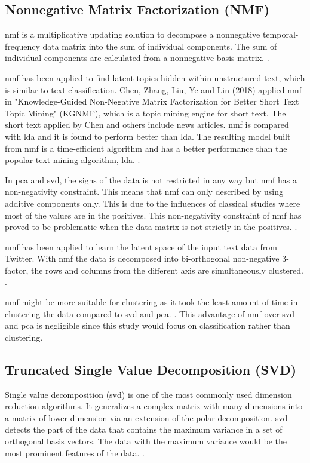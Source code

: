 \subsection{Nonnegative Matrix Factorization (NMF)}
\Ac{nmf} is a multiplicative updating solution to decompose a nonnegative temporal-frequency data matrix into the sum of individual components. The sum of individual components are calculated from a nonnegative basis matrix. \cite{nmfBook}.

\Ac{nmf} has been applied to find latent topics hidden within unstructured text, which is similar to text classification. Chen, Zhang, Liu, Ye and Lin (2018) applied \ac{nmf} in "Knowledge-Guided Non-Negative Matrix Factorization for Better Short Text Topic Mining" (KGNMF), which is a topic mining engine for short text. The short text applied by Chen and others include news articles. \Ac{nmf} is compared with \ac{lda} and it is found to perform better than \ac{lda}. The resulting model built from \ac{nmf} is a time-efficient algorithm and has a better performance than the popular text mining algorithm, \ac{lda}. \cite{shortTextNMF}.

In \ac{pca} and \ac{svd}, the signs of the data is not restricted in any way but \ac{nmf} has a non-negativity constraint. This means that \ac{nmf} can only described by using additive components only. This is due to the influences of classical studies where most of the values are in the positives. This non-negativity constraint of \ac{nmf} has proved to be problematic when the data matrix is not strictly in the positives. \cite{semiNmfPca}.

\Ac{nmf} has been applied to learn the latent space of the input text data from Twitter. With \ac{nmf} the data is decomposed into bi-orthogonal non-negative 3-factor, the rows and columns from the different axis are simultaneously clustered. \cite{nmfTwitter}.

\Ac{nmf} might be more suitable for clustering as it took the least amount of time in clustering the data compared to \ac{svd} and \ac{pca}. \cite{nmfClustering}. This advantage of \ac{nmf} over \ac{svd} and \ac{pca} is negligible since this study would focus on classification rather than clustering.\\


\subsection{Truncated Single Value Decomposition (SVD)}
Single value decomposition (\ac{svd}) is one of the most commonly used dimension reduction algorithms. It generalizes a complex matrix with many dimensions into a matrix of lower dimension via an extension of the polar decomposition. \Ac{svd} detects the part of the data that contains the maximum variance in a set of orthogonal basis vectors. The data with the maximum variance would be the most prominent features of the data. \cite{svdDef}.

